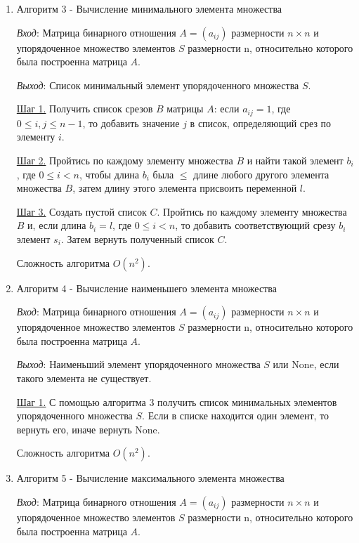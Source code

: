 \documentclass[spec, och, labwork]{shiza}
\begin{document}
\begin{enumerate}
    \item Алгоритм 3 - Вычисление минимального элемента множества
    
    \textit{Вход}: Матрица бинарного отношения $A = (a_{ij})$ размерности $n \times n$ и упорядоченное множество элементов $S$ размерности n, относительно которого
    была построенна матрица $A$.

    \textit{Выход}: Список минимальный элемент упорядоченного множества $S$.

    \underline{Шаг 1.} Получить список срезов $B$ матрицы $A$: если $a_{ij} = 1$, где $0 \leq i, j \leq n - 1$, 
    то добавить значение $j$ в список, определяющий срез по элементу $i$. 

    \underline{Шаг 2.} Пройтись по каждому элементу множества $B$ и найти такой элемент $b_i$, где $0 \leq i < n$, чтобы 
    длина $b_i$ была $\leq$ длине любого другого элемента множества $B$, затем длину этого элемента присвоить переменной $l$.

    \underline{Шаг 3.} Создать пустой список $C$. Пройтись по каждому элементу множества $B$ и, если длина $b_i = l$, где $0 \leq i < n$,
    то добавить соответствующий срезу $b_i$ элемент $s_i$. Затем вернуть полученный список $C$.

    Сложность алгоритма $O(n^2)$.

    \item Алгоритм 4 - Вычисление наименьшего элемента множества
    
    \textit{Вход}: Матрица бинарного отношения $A = (a_{ij})$ размерности $n \times n$ и упорядоченное множество элементов $S$ размерности n, относительно которого
    была построенна матрица $A$.

    \textit{Выход}: Наименьший элемент упорядоченного множества $S$ или None, если такого элемента не существует.

    \underline{Шаг 1.} С помощью алгоритма 3 получить список минимальных элементов упорядоченного множества $S$. Если в списке
    находится один элемент, то вернуть его, иначе вернуть None.

    Сложность алгоритма $O(n^2)$.

    \item Алгоритм 5 - Вычисление максимального элемента множества
    
    \textit{Вход}: Матрица бинарного отношения $A = (a_{ij})$ размерности $n \times n$ и упорядоченное множество элементов $S$ размерности n, относительно которого
    была построенна матрица $A$.


\end{enumerate}
\end{document}
